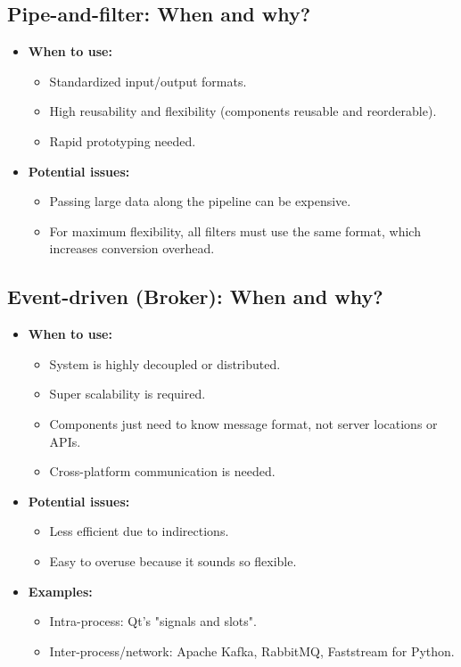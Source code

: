\documentclass[11pt,a4paper]{article}
\begin{document}
\subsection*{Pipe-and-filter: When and why?}
\begin{itemize}
    \item \textbf{When to use:}
        \begin{itemize}
            \item Standardized input/output formats.
            \item High reusability and flexibility (components reusable and reorderable).
            \item Rapid prototyping needed.
        \end{itemize}
    \item \textbf{Potential issues:}
        \begin{itemize}
            \item Passing large data along the pipeline can be expensive.
            \item For maximum flexibility, all filters must use the same format, which increases conversion overhead.
        \end{itemize}
\end{itemize}

\subsection*{Event-driven (Broker): When and why?}
\begin{itemize}
    \item \textbf{When to use:}
        \begin{itemize}
            \item System is highly decoupled or distributed.
            \item Super scalability is required.
            \item Components just need to know message format, not server locations or APIs.
            \item Cross-platform communication is needed.
        \end{itemize}
    \item \textbf{Potential issues:}
        \begin{itemize}
            \item Less efficient due to indirections.
            \item Easy to overuse because it sounds so flexible.
        \end{itemize}
    \item \textbf{Examples:}
        \begin{itemize}
            \item Intra-process: Qt's "signals and slots".
            \item Inter-process/network: Apache Kafka, RabbitMQ, Faststream for Python.
        \end{itemize}
\end{itemize}
\end{document}
